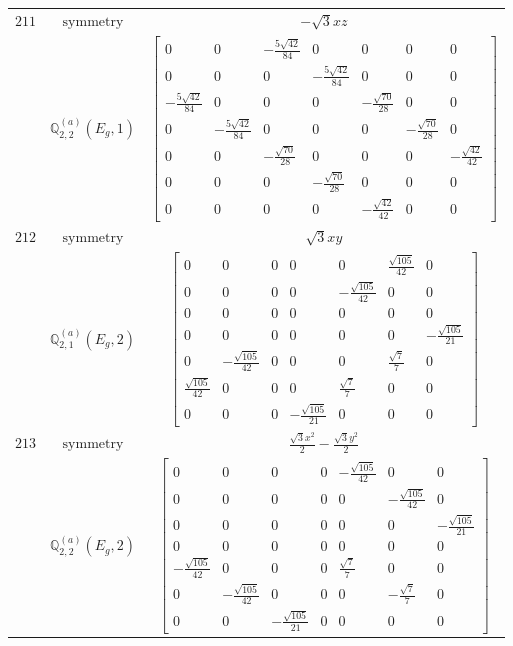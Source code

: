\documentclass[fleqn,8pt,landscape]{jsarticle}
\begin{document}
\begin{longtable}{ccc}
$ 211 $ & $ \text{symmetry} $ & $ - \sqrt{3} x z $ \\
$  $ & $ \mathbb{Q}_{2,2}^{(a)}(E_{g},1) $ & $ \begin{bmatrix} 0 & 0 & - \frac{5 \sqrt{42}}{84} & 0 & 0 & 0 & 0 \\ 0 & 0 & 0 & - \frac{5 \sqrt{42}}{84} & 0 & 0 & 0 \\ - \frac{5 \sqrt{42}}{84} & 0 & 0 & 0 & - \frac{\sqrt{70}}{28} & 0 & 0 \\ 0 & - \frac{5 \sqrt{42}}{84} & 0 & 0 & 0 & - \frac{\sqrt{70}}{28} & 0 \\ 0 & 0 & - \frac{\sqrt{70}}{28} & 0 & 0 & 0 & - \frac{\sqrt{42}}{42} \\ 0 & 0 & 0 & - \frac{\sqrt{70}}{28} & 0 & 0 & 0 \\ 0 & 0 & 0 & 0 & - \frac{\sqrt{42}}{42} & 0 & 0 \end{bmatrix} $ \\ \hline
$ 212 $ & $ \text{symmetry} $ & $ \sqrt{3} x y $ \\
$  $ & $ \mathbb{Q}_{2,1}^{(a)}(E_{g},2) $ & $ \begin{bmatrix} 0 & 0 & 0 & 0 & 0 & \frac{\sqrt{105}}{42} & 0 \\ 0 & 0 & 0 & 0 & - \frac{\sqrt{105}}{42} & 0 & 0 \\ 0 & 0 & 0 & 0 & 0 & 0 & 0 \\ 0 & 0 & 0 & 0 & 0 & 0 & - \frac{\sqrt{105}}{21} \\ 0 & - \frac{\sqrt{105}}{42} & 0 & 0 & 0 & \frac{\sqrt{7}}{7} & 0 \\ \frac{\sqrt{105}}{42} & 0 & 0 & 0 & \frac{\sqrt{7}}{7} & 0 & 0 \\ 0 & 0 & 0 & - \frac{\sqrt{105}}{21} & 0 & 0 & 0 \end{bmatrix} $ \\ \hline
$ 213 $ & $ \text{symmetry} $ & $ \frac{\sqrt{3} x^{2}}{2} - \frac{\sqrt{3} y^{2}}{2} $ \\
$  $ & $ \mathbb{Q}_{2,2}^{(a)}(E_{g},2) $ & $ \begin{bmatrix} 0 & 0 & 0 & 0 & - \frac{\sqrt{105}}{42} & 0 & 0 \\ 0 & 0 & 0 & 0 & 0 & - \frac{\sqrt{105}}{42} & 0 \\ 0 & 0 & 0 & 0 & 0 & 0 & - \frac{\sqrt{105}}{21} \\ 0 & 0 & 0 & 0 & 0 & 0 & 0 \\ - \frac{\sqrt{105}}{42} & 0 & 0 & 0 & \frac{\sqrt{7}}{7} & 0 & 0 \\ 0 & - \frac{\sqrt{105}}{42} & 0 & 0 & 0 & - \frac{\sqrt{7}}{7} & 0 \\ 0 & 0 & - \frac{\sqrt{105}}{21} & 0 & 0 & 0 & 0 \end{bmatrix} $ \\ \hline

\end{longtable}
\end{document}
